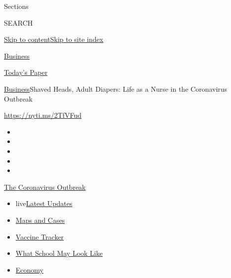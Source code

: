 Sections

SEARCH

\protect\hyperlink{site-content}{Skip to
content}\protect\hyperlink{site-index}{Skip to site index}

\href{https://www.nytimes3xbfgragh.onion/section/business}{Business}

\href{https://myaccount.nytimes3xbfgragh.onion/auth/login?response_type=cookie\&client_id=vi}{}

\href{https://www.nytimes3xbfgragh.onion/section/todayspaper}{Today's
Paper}

\href{/section/business}{Business}\textbar{}Shaved Heads, Adult Diapers:
Life as a Nurse in the Coronavirus Outbreak

\url{https://nyti.ms/2TfVFud}

\begin{itemize}
\item
\item
\item
\item
\item
\end{itemize}

\href{https://www.nytimes3xbfgragh.onion/news-event/coronavirus?action=click\&pgtype=Article\&state=default\&region=TOP_BANNER\&context=storylines_menu}{The
Coronavirus Outbreak}

\begin{itemize}
\tightlist
\item
  live\href{https://www.nytimes3xbfgragh.onion/2020/08/02/world/coronavirus-updates.html?action=click\&pgtype=Article\&state=default\&region=TOP_BANNER\&context=storylines_menu}{Latest
  Updates}
\item
  \href{https://www.nytimes3xbfgragh.onion/interactive/2020/us/coronavirus-us-cases.html?action=click\&pgtype=Article\&state=default\&region=TOP_BANNER\&context=storylines_menu}{Maps
  and Cases}
\item
  \href{https://www.nytimes3xbfgragh.onion/interactive/2020/science/coronavirus-vaccine-tracker.html?action=click\&pgtype=Article\&state=default\&region=TOP_BANNER\&context=storylines_menu}{Vaccine
  Tracker}
\item
  \href{https://www.nytimes3xbfgragh.onion/interactive/2020/07/29/us/schools-reopening-coronavirus.html?action=click\&pgtype=Article\&state=default\&region=TOP_BANNER\&context=storylines_menu}{What
  School May Look Like}
\item
  \href{https://www.nytimes3xbfgragh.onion/live/2020/07/31/business/stock-market-today-coronavirus?action=click\&pgtype=Article\&state=default\&region=TOP_BANNER\&context=storylines_menu}{Economy}
\end{itemize}

